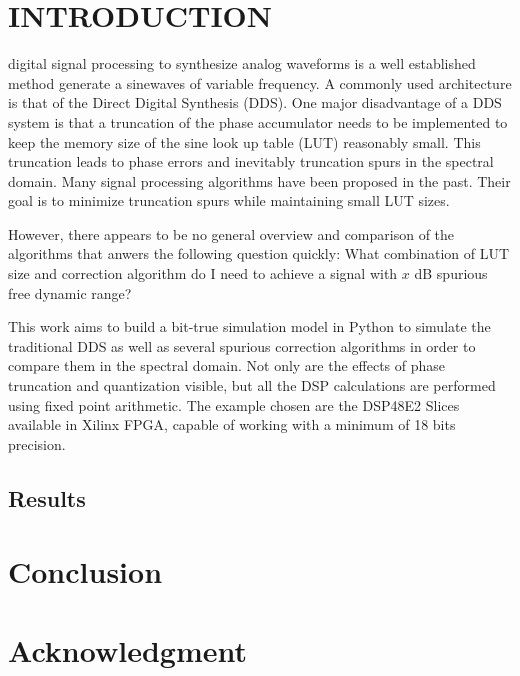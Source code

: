 \documentclass[lettersize,journal]{IEEEtran}
\begin{document}
\section{INTRODUCTION}

 digital signal processing to synthesize analog waveforms is a well established method generate a sinewaves of variable frequency. A commonly used architecture is that of the Direct Digital Synthesis (DDS). One major disadvantage of a DDS system is that a truncation of the phase accumulator needs to be implemented to keep the memory size of the sine look up table (LUT) reasonably small. This truncation leads to phase errors and inevitably truncation spurs in the spectral domain. Many signal processing algorithms have been proposed in the past. Their goal is to minimize truncation spurs while maintaining small LUT sizes.

However, there appears to be no general overview and comparison of the algorithms that anwers the following question quickly:
What combination of LUT size and correction algorithm do I need to achieve a signal with $x$ dB spurious free dynamic range?

This work aims to build a bit-true simulation model in Python to simulate the traditional DDS as well as several spurious correction algorithms in order to compare them in the spectral domain. Not only are the effects of phase truncation and quantization visible, but all the DSP calculations are performed using fixed point arithmetic. The example chosen are the DSP48E2 Slices available in Xilinx FPGA, capable of working with a minimum of 18 bits precision.





\subsection{Results}


\section{Conclusion}


\section*{Acknowledgment}
\end{document}
